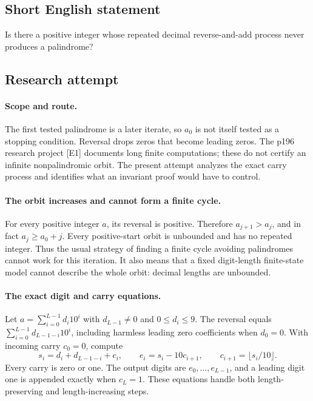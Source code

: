 \documentclass[11pt,a4paper]{article}
\begin{document}
\subsection{Short English statement}

Is there a positive integer whose repeated decimal reverse-and-add process never produces a palindrome?

\subsection{Research attempt}

\paragraph{Scope and route.}
The first tested palindrome is a later iterate, so $a_0$ is not itself
tested as a stopping condition. Reversal drops zeros that become
leading zeros. The p196 research project [E1] documents long finite
computations; these do not certify an infinite nonpalindromic orbit.
The present attempt analyzes the exact carry process and identifies
what an invariant proof would have to control.

\paragraph{The orbit increases and cannot form a finite cycle.}
For every positive integer $a$, its reversal is positive. Therefore
$a_{j+1}>a_j$, and in fact $a_j\ge a_0+j$. Every positive-start orbit
is unbounded and has no repeated integer. Thus the usual strategy of
finding a finite cycle avoiding palindromes cannot work for this
iteration. It also means that a fixed digit-length finite-state model
cannot describe the whole orbit: decimal lengths are unbounded.

\paragraph{The exact digit and carry equations.}
Let $a=\sum_{i=0}^{L-1}d_i10^i$ with $d_{L-1}\ne0$ and
$0\le d_i\le9$. The reversal equals
$\sum_{i=0}^{L-1}d_{L-1-i}10^i$, including harmless leading zero
coefficients when $d_0=0$. With incoming carry $c_0=0$, compute
\[
 s_i=d_i+d_{L-1-i}+c_i,\qquad
 e_i=s_i-10c_{i+1},\qquad c_{i+1}=\lfloor s_i/10\rfloor.
\]
Every carry is zero or one. The output digits are $e_0,\ldots,e_{L-1}$,
and a leading digit one is appended exactly when $c_L=1$. These
equations handle both length-preserving and length-increasing steps.
\end{document}
